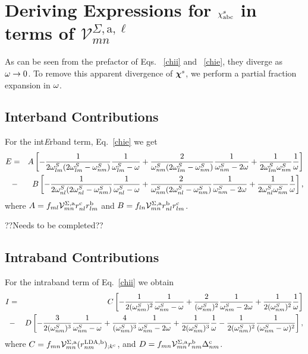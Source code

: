 \section{Deriving Expressions for \texorpdfstring{$\chi^s_{\mathrm{a}\mathrm{b}\mathrm{c}}$}{Xabc}
in terms of \texorpdfstring{$\mathcal{V}^{\Sigma,\text{a},\ell}_{mn}$}{Vmn}}
\label{appv}

As can be seen from the prefactor of Eqs. ~\eqref{chii} and
~\eqref{chie}, they 
diverge as $\omega\to 0$. To remove this apparent 
divergence of $\boldsymbol{\chi}^s$, we perform
a partial fraction  expansion in $\omega$.

\subsection{Interband Contributions}

For
the int{\it E}rband term, Eq.~\eqref{chie} we get
\begin{eqnarray}\label{pfe}  
E&=&  
A
\left[
-\frac{1}{2\omega^S_{lm}(2\omega^S_{lm}-\omega^S_{nm})}\frac{1}{\omega^S_{lm}-\omega}
+\frac{2}{\omega^S_{nm}(2\omega^S_{lm}-\omega^S_{nm})}\frac{1}{\omega^S_{nm}-2\omega}
+\frac{1}{2\omega^S_{lm}\omega^S_{nm}}\frac{1}{\omega}
\right]
\nonumber\\
&-& 
B
\left[
-\frac{1}{2\omega^S_{nl}(2\omega^S_{nl}-\omega^S_{nm})}\frac{1}{\omega^S_{nl}-\omega}
+\frac{2}{\omega^S_{nm}(2\omega^S_{nl}-\omega^S_{nm})}\frac{1}{\omega^S_{nm}-2\omega}
+\frac{1}{2\omega^S_{nl}\omega^S_{nm}}\frac{1}{\omega}
\right]
,
\end{eqnarray}  
where 
$A=f_{ml}{\cal V}^{\Sigma,\mathrm{a}}_{mn}r^{\mathrm{c}}_{nl}r^{\mathrm{b}}_{lm}$   
and
$B=f_{ln}{\cal V}^{\Sigma,\mathrm{a}}_{mn}r^{\mathrm{b}}_{nl}r^{\mathrm{c}}_{lm}$.

??Needs to be completed??

\subsection{Intraband Contributions}

For the intraband term of Eq.~\eqref{chii}
we obtain
\begin{eqnarray}\label{pfinn} 
I&=& 
C
\left[
-\frac{1}{2(\omega^S_{nm})^2}\frac{1}{\omega^S_{nm}-\omega}
+\frac{2}{(\omega^S_{nm})^2}\frac{1}{\omega^S_{nm}-2\omega}
+\frac{1}{2(\omega^S_{nm})^2}\frac{1}{\omega}
\right]
\nonumber\\
&-&D
\left[
-\frac{3}{2(\omega^S_{nm})^3}\frac{1}{\omega^S_{nm}-\omega}
+\frac{4}{(\omega^S_{nm})^3}\frac{1}{\omega^S_{nm}-2\omega}
+\frac{1}{2(\omega^S_{nm})^3}\frac{1}{\omega}
-\frac{1}{2(\omega^S_{nm})^2}\frac{1}{(\omega^S_{nm}-\omega)^2}
\right]
,
\end{eqnarray} 
where 
$C=f_{mn}{\cal V}^{\Sigma,\mathrm{a}}_{mn}(r^{\mathrm{LDA},\mathrm{b}}_{nm})_{;k^{\mathrm{c}}}$, 
and
$D=f_{mn}{\cal V}^{\Sigma,\mathrm{a}}_{mn}r^{\mathrm{b}}_{nm}\Delta^{\mathrm{c}}_{nm}$.

